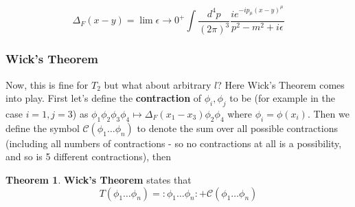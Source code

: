 \documentclass{article}
\theoremstyle{definition}
\newtheorem{theorem}{Theorem}
\begin{document}
$$ \Delta_F(x - y) = \lim{\epsilon \to 0^+} \int \frac{d^4p}{(2\pi)^3} \frac{i
  e^{-ip_\mu (x - y)^\mu}}{p^2 - m^2 + i\epsilon} $$

\subsubsection{Wick's Theorem}

Now, this is fine for $T_2$ but what about arbitrary $l$? Here Wick's Theorem
comes into play. First let's define the \textbf{contraction} of $\phi_i, \phi_j$
to be (for example in the case $i=1, j=3$) as $\phi_1 \phi_2 \phi_3 \phi_4
\mapsto \Delta_F(x_1 - x_3) \phi_2 \phi_4$ where $\phi_i = \phi(x_i)$. Then we
define the symbol $\mathcal{C}(\phi_1 \dots \phi_n)$ to denote the sum over all
possible contractions (including all numbers of contractions - so no
contractions at all is a possibility, and so is 5 different contractions), then

\begin{theorem}
  \textbf{Wick's Theorem} states that
  $$ T(\phi_1 \dots \phi_n) = : \phi_1 \dots \phi_n : + \mathcal{C}(\phi_1 \dots
  \phi_n) $$
\end{theorem}
\end{document}
